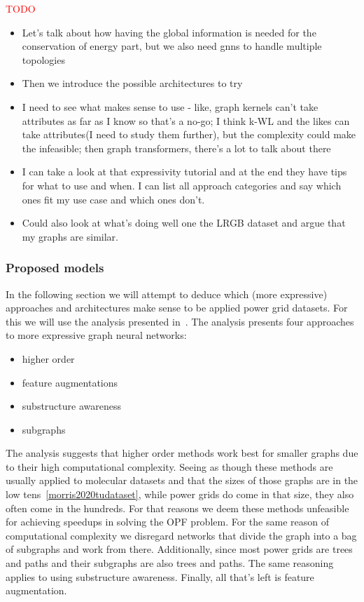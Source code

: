 \textcolor{red}{TODO}


\begin{itemize}
    \item Let's talk about how having the global information is needed for the conservation of energy
    part, but we also need gnns to handle multiple topologies
    \item Then we introduce the possible architectures to try
    \item I need to see what makes sense to use - like, graph kernels can't take attributes as far as I
    know so that's a no-go; I think k-WL and the likes can take attributes(I need to study them further),
    but the complexity could make the infeasible; then graph transformers, there's a lot to talk about there
    \item I can take a look at that expressivity tutorial and at the end they have tips for what to use and when.
    I can list all approach categories and say which ones fit my use case and which ones don't.
    \item Could also look at what's doing well one the LRGB dataset and argue that my graphs are similar.
\end{itemize}

\subsubsection*{Proposed models}
In the following section we will attempt to deduce which (more expressive) approaches and architectures
make sense to be applied power grid datasets.
For this we will use the analysis presented in~\cite{expresive2022tutorial}.
The analysis presents four approaches to more expressive graph neural networks:
\begin{itemize}
    \item higher order
    \item feature augmentations
    \item substructure awareness
    \item subgraphs
\end{itemize}

The analysis suggests that higher order methods work best for smaller graphs due to their high computational complexity.
Seeing as though these methods are usually applied to molecular datasets and that the sizes of those graphs are in
the low tens~\ref{morris2020tudataset}, while power grids do come in that size, they also often come in the hundreds.
For that reasons we deem these methods unfeasible for achieving speedups in solving the OPF problem.
For the same reason of computational complexity we disregard networks that divide the graph into a bag of subgraphs and work from there.
Additionally, since most power grids are trees and paths and their subgraphs are also trees and paths.
The same reasoning applies to using substructure awareness.
Finally, all that's left is feature augmentation.


